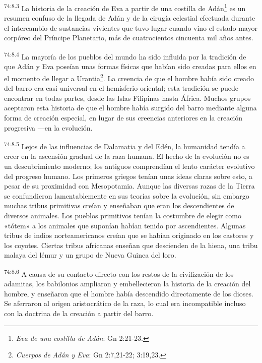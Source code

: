 \par
\textsuperscript{74:8.3} La historia de la creación de Eva a partir de una costilla de Adán\footnote{\textit{Eva de una costilla de Adán}: Gn 2:21-23.} es un resumen confuso de la llegada de Adán y de la cirugía celestial efectuada durante el intercambio de sustancias vivientes que tuvo lugar cuando vino el estado mayor corpóreo del Príncipe Planetario, más de cuatrocientos cincuenta mil años antes.

\par
\textsuperscript{74:8.4} La mayoría de los pueblos del mundo ha sido influida por la tradición de que Adán y Eva poseían unas formas físicas que habían sido creadas para ellos en el momento de llegar a Urantia\footnote{\textit{Cuerpos de Adán y Eva}: Gn 2:7,21-22; 3:19,23.}. La creencia de que el hombre había sido creado del barro era casi universal en el hemisferio oriental; esta tradición se puede encontrar en todas partes, desde las Islas Filipinas hasta África. Muchos grupos aceptaron esta historia de que el hombre había surgido del barro mediante alguna forma de creación especial, en lugar de sus creencias anteriores en la creación progresiva ---en la evolución.

\par
\textsuperscript{74:8.5} Lejos de las influencias de Dalamatia y del Edén, la humanidad tendía a creer en la ascensión gradual de la raza humana. El hecho de la evolución no es un descubrimiento moderno; los antiguos comprendían el lento carácter evolutivo del progreso humano. Los primeros griegos tenían unas ideas claras sobre esto, a pesar de su proximidad con Mesopotamia. Aunque las diversas razas de la Tierra se confundieron lamentablemente en sus teorías sobre la evolución, sin embargo muchas tribus primitivas creían y enseñaban que eran los descendientes de diversos animales. Los pueblos primitivos tenían la costumbre de elegir como «tótem» a los animales que suponían habían tenido por ascendientes. Algunas tribus de indios norteamericanos creían que se habían originado en los castores y los coyotes. Ciertas tribus africanas enseñan que descienden de la hiena, una tribu malaya del lémur y un grupo de Nueva Guinea del loro.

\par
\textsuperscript{74:8.6} A causa de su contacto directo con los restos de la civilización de los adamitas, los babilonios ampliaron y embellecieron la historia de la creación del hombre, y enseñaron que el hombre había descendido directamente de los dioses. Se aferraron al origen aristocrático de la raza, lo cual era incompatible incluso con la doctrina de la creación a partir del barro.

